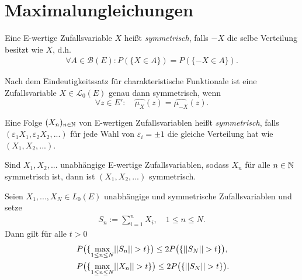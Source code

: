 \section{Maximalungleichungen}

\begin{mydef}
    Eine E-wertige Zufallsvariable $X$ heißt \textit{symmetrisch}, falls $-X$ die selbe Verteilung besitzt wie $X$, d.h.
    \begin{align*}
        \forall A \in \mathcal{B}(E): P(\{X \in A\}) = P(\{-X \in A\}). 
    \end{align*}
\end{mydef}

\begin{remark}
    Nach dem Eindeutigkeitssatz für charakteristische Funktionale ist eine Zufallsvariable $X \in \mathcal{L}_0(E)$ genau dann symmetrisch, wenn 
    $$
        \forall z \in E': \quad \widehat{\mu_X}(z) = \widehat{\mu_{-X}}(z). 
    $$
\end{remark}

\begin{mydef}%
    Eine Folge $(X_n)_{n \in \mathbb{N}}$ von E-wertigen Zufallsvariablen heißt \textit{symmetrisch}, 
    falls $(\varepsilon_1 X_1, \varepsilon_2 X_2,...)$ für jede Wahl von $\varepsilon_i = \pm 1$ 
    die gleiche Verteilung hat wie $(X_1,X_2,...)$. 
\end{mydef}

\begin{remark}
   Sind $X_1,X_2,...$ unabhängige E-wertige Zufallsvariablen, sodass $X_n$ für alle $n \in \mathbb{N}$ symmetrisch ist, dann ist $(X_1,X_2,...)$ symmetrisch. 
\end{remark}

\begin{theorem}
    Seien $X_1,...,X_N \in L_0(E)$ unabhängige und symmetrische Zufallsvariablen und setze 
    \begin{align*}
        S_n := \sum_{i=1}^n X_i, \quad 1 \leq n \leq N. 
    \end{align*}
    Dann gilt für alle $t > 0$
    \begin{align}
        &P\big(\{ \max_{1 \leq n \leq N} \lvert\lvert S_n \rvert\rvert > t \}\big) \leq 2 P\big(\{\lvert\lvert S_N \rvert\rvert > t \}\big), \\\
        &P\big(\{ \max_{1 \leq n \leq N} \lvert\lvert X_n \rvert\rvert > t \}\big) \leq 2 P\big(\{\lvert\lvert S_N \rvert\rvert > t \}\big).
    \end{align}
\end{theorem}

